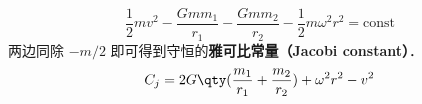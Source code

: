 

\begin{equation}
\frac{1}{2}mv^2 - \frac{Gmm_1}{r_1} - \frac{Gmm_2}{r_2} - \frac{1}{2}m\omega^2 r^2 = \text{const}
\end{equation}
两边同除 $-m/2$ 即可得到守恒的\textbf{雅可比常量（Jacobi constant）}．
\begin{equation}
C_j = 2G\qty(\frac{m_1}{r_1} + \frac{m_2}{r_2}) + \omega^2 r^2 - v^2
\end{equation}
